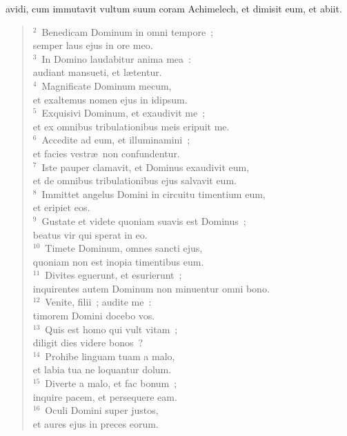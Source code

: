 \bchapter[Psalm]
avidi, cum immutavit vultum suum coram Achimelech, et dimisit eum, et abiit.
\begin{verse}${}^{2}$~Benedicam Dominum in omni tempore~;\\ semper laus ejus in ore meo.\\
${}^{3}$~In Domino laudabitur anima mea~:\\ audiant mansueti, et l\ae tentur.\\
${}^{4}$~Magnificate Dominum mecum,\\ et exaltemus nomen ejus in idipsum.\\
${}^{5}$~Exquisivi Dominum, et exaudivit me~;\\ et ex omnibus tribulationibus meis eripuit me.\\
${}^{6}$~Accedite ad eum, et illuminamini~;\\ et facies vestr\ae\ non confundentur.\\
${}^{7}$~Iste pauper clamavit, et Dominus exaudivit eum,\\ et de omnibus tribulationibus ejus salvavit eum.\\
${}^{8}$~Immittet angelus Domini in circuitu timentium eum,\\ et eripiet eos.\\
${}^{9}$~Gustate et videte quoniam suavis est Dominus~;\\ beatus vir qui sperat in eo.\\
${}^{10}$~Timete Dominum, omnes sancti ejus,\\ quoniam non est inopia timentibus eum.\\
${}^{11}$~Divites eguerunt, et esurierunt~;\\ inquirentes autem Dominum non minuentur omni bono.\\
${}^{12}$~Venite, filii~; audite me~:\\ timorem Domini docebo vos.\\
${}^{13}$~Quis est homo qui vult vitam~;\\ diligit dies videre bonos~?\\
${}^{14}$~Prohibe linguam tuam a malo,\\ et labia tua ne loquantur dolum.\\
${}^{15}$~Diverte a malo, et fac bonum~;\\ inquire pacem, et persequere eam.\\
${}^{16}$~Oculi Domini super justos,\\ et aures ejus in preces eorum.\\

\end{verse}
